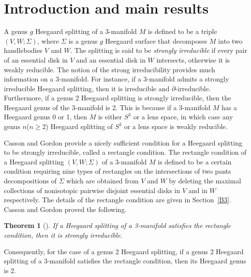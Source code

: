 \documentclass[12pt]{amsart}
\newtheorem{Thm}[theorem]{Theorem}
\begin{document}
\section{Introduction and main results}\label{B1}


A genus $g$ Heegaard splitting of a 3-manifold $M$ is defined to be a triple $(V, W; \Sigma)$, where $\Sigma$ is a genus $g$ Heegaard surface that
decomposes $M$ into two handlebodies $V$ and $W$.
The splitting is said to be \textit{strongly irreducible} if every pair of an essential disk in $V$ and an essential disk in $W$ intersects,
otherwise it is weakly reducible. The notion of the strong irreducibility provides much information on a 3-manifold.
For instance, if a 3-manifold admits a strongly irreducible Heegaard splitting, then it is irreducible and $\partial$-irreducible.
Furthermore, if a genus 2 Heegaard splitting is strongly irreducible, then the Heegaard genus of the 3-manifold is 2.
This is because if a 3-manifold $M$ has a Heegaard genus 0 or 1, then $M$ is either $S^3$ or a lens space,
in which case any genus $n$($n\geq 2$) Heegaard splitting of $S^3$ or a lens space is weakly reducible.


Casson and Gordon \cite{CG} provide a nicely sufficient condition for a Heegaard splitting to be strongly irreducible, called
a rectangle condition. The rectangle condition of a Heegaard splitting $(V, W; \Sigma)$ of a 3-manifold $M$ is defined to be a certain condition
requiring nine types of rectangles on the intersections of two pants decompositions of $\Sigma$ which are obtained from $V$ and $W$ by deleting the maximal collections of
nonisotopic pairwise disjoint essential disks in $V$ and in $W$ respectively. The details of the rectangle condition are given in Section~\ref{B3}.
Casson and Gordon \cite{CG} proved the following.

\begin{Thm}[\cite{CG}]\label{Casson-Gordon}
If a Heegaard splitting of a 3-manifold satisfies the rectangle condition, then it is strongly irreducible.
\end{Thm}

Consequently, for the case of a genus 2 Heegaard splitting, if a genus 2 Heegaard splitting of a 3-manifold satisfies the rectangle condition, then its Heegaard
genus is 2.
\end{document}
